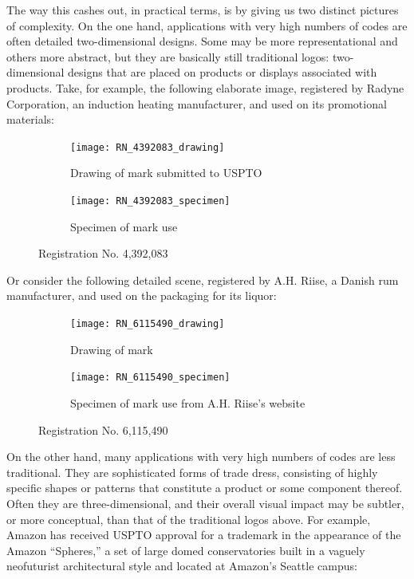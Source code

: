 \documentclass[letterpaper, 11pt, oneside]{article}
\begin{document}
The way this cashes out, in practical terms, is by giving us two distinct pictures of complexity. On the one hand, applications with very high numbers of codes are often detailed two-dimensional designs. Some may be more representational and others more abstract, but they are basically still traditional logos: two-dimensional designs that are placed on products or displays associated with products. Take, for example, the following elaborate image, registered by Radyne Corporation, an induction heating manufacturer, and used on its promotional materials:

\begin{figure}[H]
\centering
\begin{subfigure}[h]{0.3\linewidth}
\texttt{[image: RN\_4392083\_drawing]} \
\caption{Drawing of mark submitted to USPTO}
\end{subfigure}
\hspace{30pt}
\begin{subfigure}[h]{0.425\linewidth}
\texttt{[image: RN\_4392083\_specimen]} \
\caption{Specimen of mark use}
\end{subfigure}
\caption*{Registration No. 4,392,083}
\end{figure}
\par

\noindent Or consider the following detailed scene, registered by A.H. Riise, a Danish rum manufacturer, and used on the packaging for its liquor:

\begin{figure}[H]
\centering
\begin{subfigure}[h]{0.4\linewidth}
\texttt{[image: RN\_6115490\_drawing]} \
\caption{Drawing of mark}
\end{subfigure}
\hspace{30pt}
\begin{subfigure}[h]{0.25\linewidth}
\texttt{[image: RN\_6115490\_specimen]} \
\caption{Specimen of mark use from A.H. Riise's website}
\end{subfigure}
\caption*{Registration No. 6,115,490}
\end{figure}
\par

\noindent On the other hand, many applications with very high numbers of codes are less traditional. They are sophisticated forms of trade dress, consisting of highly specific shapes or patterns that constitute a product or some component thereof. Often they are three-dimensional, and their overall visual impact may be subtler, or more conceptual, than that of the traditional logos above. For example, Amazon has received USPTO approval for a trademark in the appearance of the Amazon ``Spheres,'' a set of large domed conservatories built in a vaguely neofuturist architectural style and located at Amazon's Seattle campus:
\end{document}
